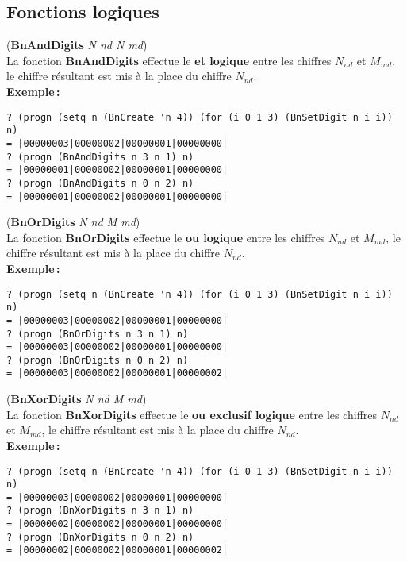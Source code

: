 \subsection{Fonctions logiques}
({\bf BnAndDigits} {\em N nd N md})
\\[12pt]
La fonction {\bf BnAndDigits} effectue le {\bf et logique} entre les chiffres
$N_{nd}$ et $M_{md}$, le chiffre r\'esultant est mis \`a la place du chiffre
$N_{nd}$.
\\[18pt]
{\bf Exemple\,:}
\begin{verbatim}
? (progn (setq n (BnCreate 'n 4)) (for (i 0 1 3) (BnSetDigit n i i)) n)
= |00000003|00000002|00000001|00000000|
? (progn (BnAndDigits n 3 n 1) n)
= |00000001|00000002|00000001|00000000|
? (progn (BnAndDigits n 0 n 2) n)
= |00000001|00000002|00000001|00000000|
\end{verbatim}
\vspace*{24pt}
({\bf BnOrDigits} {\em N nd M md})
\\[12pt]
La fonction {\bf BnOrDigits} effectue le {\bf ou logique} entre les chiffres
$N_{nd}$ et $M_{md}$, le chiffre r\'esultant est mis \`a la place du chiffre
$N_{nd}$.
\\[18pt]
{\bf Exemple\,:}
\begin{verbatim}
? (progn (setq n (BnCreate 'n 4)) (for (i 0 1 3) (BnSetDigit n i i)) n)
= |00000003|00000002|00000001|00000000|
? (progn (BnOrDigits n 3 n 1) n)
= |00000003|00000002|00000001|00000000|
? (progn (BnOrDigits n 0 n 2) n)
= |00000003|00000002|00000001|00000002|
\end{verbatim}
\vspace*{24pt}
({\bf BnXorDigits} {\em N nd M md})
\\[12pt]
La fonction {\bf BnXorDigits} effectue le {\bf ou exclusif logique} entre
les chiffres $N_{nd}$ et $M_{md}$, le chiffre r\'esultant est mis
\`a la place du chiffre $N_{nd}$.
\\[18pt]
{\bf Exemple\,:}
\begin{verbatim}
? (progn (setq n (BnCreate 'n 4)) (for (i 0 1 3) (BnSetDigit n i i)) n)
= |00000003|00000002|00000001|00000000|
? (progn (BnXorDigits n 3 n 1) n)
= |00000002|00000002|00000001|00000000|
? (progn (BnXorDigits n 0 n 2) n)
= |00000002|00000002|00000001|00000002|
\end{verbatim}
\vspace*{15pt}


